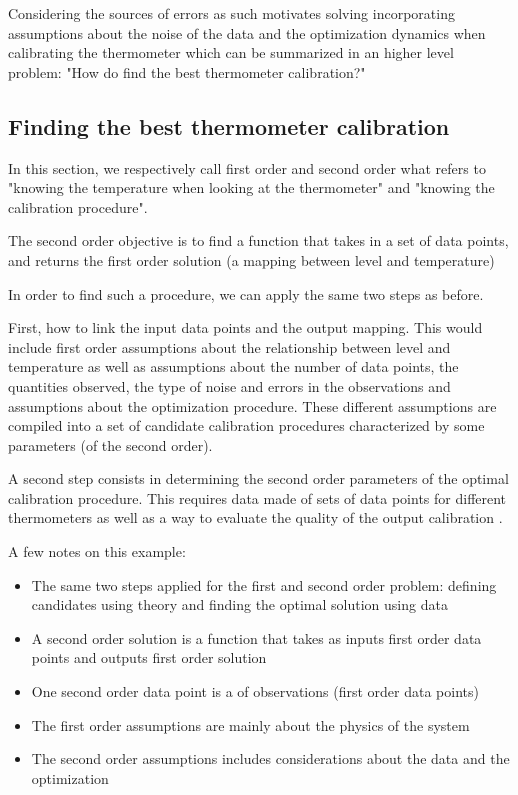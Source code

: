 \begin{bibunit}
Considering the sources of errors as such motivates solving incorporating assumptions about the noise of the data and the optimization dynamics when calibrating the thermometer which can be summarized in an higher level problem: "How do find the best thermometer calibration?"

\subsection{Finding the best thermometer calibration}
In this section, we respectively call first order and second order what refers to "knowing the temperature when looking at the thermometer" and  "knowing the calibration procedure". 

  The second order objective is to find a function that takes in a set of data points, and returns the first order solution (a mapping between level and temperature)

In order to find such a procedure, we can apply the same two steps as before.

  First, how to link the input data points and the output mapping. This would include first order assumptions about the relationship between level and temperature  as well as assumptions about the number of data points, the quantities observed, the type of noise and errors in the observations and assumptions about the optimization procedure. These different assumptions are compiled into a set of candidate calibration procedures characterized by some parameters (of the second order).

A second step consists in determining the second order parameters of the optimal calibration procedure. This requires data made of sets of data points for different thermometers as well as a way to evaluate the quality of the output calibration .


A few notes on this example:
\begin{itemize}
\item The same two steps applied for the first and second order problem: defining candidates using theory and finding the optimal solution using data
\item A second order solution is a function that takes as inputs first order data points and outputs first order solution
\item One second order data point is a  of observations (first order data points)
\item The first order assumptions are mainly about the physics of the system
\item The second order assumptions includes considerations about the data and the optimization
  \end{itemize}



\end{bibunit}
